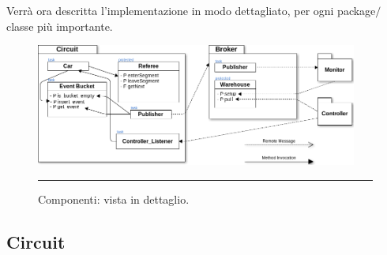 Verrà ora descritta l’implementazione in modo dettagliato, per ogni package$/$classe più importante.
\begin{figure}[htbp]
	\centering
		\includegraphics[keepaspectratio = true, width = 400px] {Pictures/SchemaOverview}
		\rule{35em}{0.5pt}
	\caption[Componenti]{Componenti: vista in dettaglio.}
	\label{fig:SchemaOverview}
\end{figure}

\subsection{Circuit}

